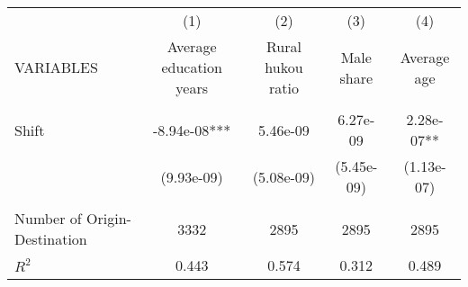 \begin{tabular}{lcccc} \hline
 & (1) & (2) & (3) & (4) \\
VARIABLES & Average education years & Rural hukou ratio & Male share & Average age \\ \hline
 &  &  &  &  \\
Shift & -8.94e-08*** & 5.46e-09 & 6.27e-09 & 2.28e-07** \\
 & (9.93e-09) & (5.08e-09) & (5.45e-09) & (1.13e-07) \\
 &  &  &  &  \\
Number of Origin-Destination & 3332 & 2895 & 2895 & 2895 \\
 $ R^2$ & 0.443 & 0.574 & 0.312 & 0.489 \\ \hline
\end{tabular}
